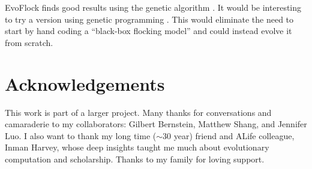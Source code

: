 \documentclass[letterpaper]{article}
\begin{document}
EvoFlock finds good results using the genetic algorithm \citep{holland_adaptation_1975}. It would be interesting to try a version using genetic programming \citep{koza_genetic_1992}. This would eliminate the need to start by hand coding a ``black-box flocking model'' and could instead evolve it from scratch.

\section{Acknowledgements}
\label{sec:ack}

This work is part of a larger project. Many thanks for conversations and camaraderie to my collaborators: Gilbert Bernstein, Matthew Shang, and Jennifer Luo. I also want to thank my long time ($\sim$30 year) friend and ALife colleague, Inman Harvey, whose deep insights taught me much about evolutionary computation and scholarship. Thanks to my family for loving support.






\end{document}
